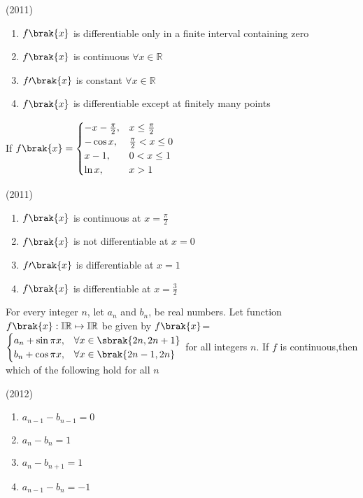     \hfill(2011)
    
    \begin{enumerate}
	\item $f\brak{x}$ is differentiable only in a finite interval containing zero 
        \item $f\brak{x}$ is continuous $\forall x\in \mathbb{R}$
	\item $f{\prime}\brak{x}$ is constant $\forall x\in \mathbb{R}$
        \item $f\brak{x}$ is differentiable except at finitely many points 
    \end{enumerate}


    \item 
    If $f\brak{x}= 
    \begin{cases}
        -x-\frac{\pi}{2}, & x\leq \frac{\pi}{2} \\
        -\cos x, & \frac{\pi}{2}<x\leq 0 \\
        x-1, & 0<x\leq1 \\
        \ln x, & x>1
    \end{cases}$ 

    \hfill(2011)
    
    \begin{enumerate}
        \item $f\brak{x}$ is continuous at $x=\frac{\pi}{2}$
        \item $f\brak{x}$ is not differentiable at $x=0$
	\item $f{\prime}\brak{x}$ is differentiable at $x=1$
        \item $f\brak{x}$ is differentiable at $x=\frac{3}{2}$
    \end{enumerate}

    \item 
    For every integer $n$, let $a_n$ and $b_n$, be real numbers. Let function $f\brak{x}: \mathbb{IR} \mapsto \mathbb{IR}$ be given by
    $f\brak{x}$= 
    $\begin{cases}
       a_n+\sin\pi x, & \forall x\in \sbrak{2n,2n+1} \\
       b_n+\cos\pi x, & \forall x\in \brak{2n-1,2n}
    \end{cases}$
    for all integers $n$. If $f$ is continuous,then which of the following hold for all $n$ 

    \hfill(2012)
    
    \begin{enumerate}        
        \item $a_{n-1}-b_{n-1}=0$ 
        \item $a_n-b_n=1$ 
        \item $a_n-b_{n+1}=1$ 
        \item $a_{n-1}-b_n=-1$ 
    \end{enumerate}


